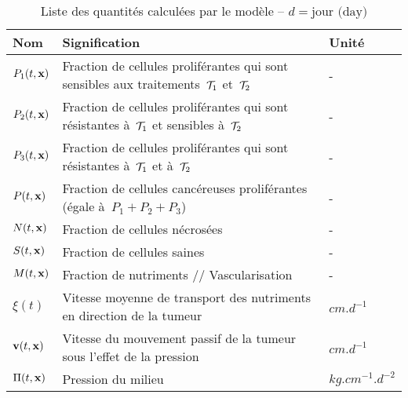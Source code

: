 \documentclass[main.tex]{subfiles}
\begin{document}
 \begin{table}[t]
 \centering
 {\footnotesize%
 \begin{tabularx}{\textwidth}{|l|X|l|}
 \hline
 \rowcolor[gray]{0.7} 
 Nom & Signification  & Unité \\
 \hline
 $P_1(t,\mathbf{x})$ & Fraction de cellules proliférantes qui sont sensibles 
 aux traitements~${\mathcal T_1}$ et~${\mathcal T_2}$ & -  \\
 \hline
 $P_2(t,\mathbf{x})$ & Fraction de cellules proliférantes qui sont résistantes à~${\mathcal T_1}$ et sensibles à~${\mathcal T_2}$  & -  \\
 \hline
 $P_3(t,\mathbf{x})$ & Fraction de cellules proliférantes qui sont résistantes à~${\mathcal T_1}$ et à~${\mathcal T_2}$  & -  \\
 \hline
 $P(t,\mathbf{x})$ & Fraction de cellules cancéreuses proliférantes (égale à~$P_1+P_2+P_3$) & -  \\
 \hline
 $N(t,\mathbf{x})$ & Fraction de cellules nécrosées & - \\
 \hline
 $S(t,\mathbf{x})$ & Fraction de cellules saines & - \\
 \hline
 $M(t,\mathbf{x})$ & Fraction de nutriments // Vascularisation & - \\
 \hline
 $\xi(t)$ &Vitesse moyenne de transport des nutriments en direction de la tumeur & $cm.d^{-1}$ \\
 \hline
 $\mathbf{v}(t,\mathbf{x})$ &Vitesse du mouvement passif de la tumeur sous l'effet de la pression& $cm.d^{-1}$ \\
 \hline
 $\Pi(t,\mathbf{x})$ & Pression du milieu\protect\footnotemark
 & $kg.cm^{-1}.d^{-2}$\\
 \hline
 \end{tabularx}
 }
 \caption{\label{table_variable}Liste des quantités calculées par le modèle
 -- $d=\textrm{jour (day)}$ } 
 \end{table}
\end{document}
